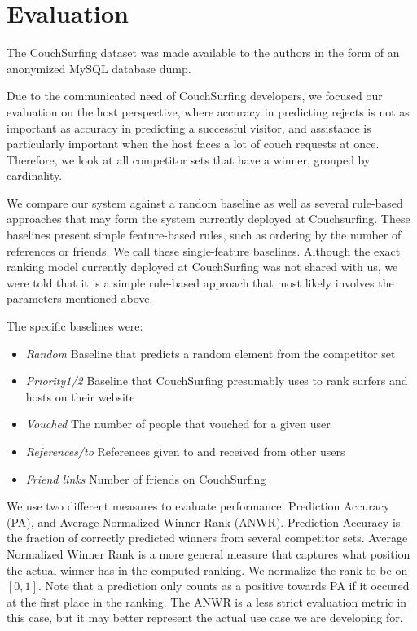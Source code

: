 \section{Evaluation} \label{sec:evaluation}

The CouchSurfing dataset was made available to the authors in the form of an anonymized MySQL database dump.

Due to the communicated need of CouchSurfing developers, we focused our evaluation on the host perspective, where accuracy in predicting rejects is not as important as accuracy in predicting a successful visitor, and assistance is particularly important when the host faces a lot of couch requests at once.
Therefore, we look at all competitor sets that have a winner, grouped by cardinality.

We compare our system against a random baseline as well as several rule-based approaches that may form the system currently deployed at Couchsurfing.
These baselines present simple feature-based rules, such as ordering by the number of references or friends.
We call these single-feature baselines.
Although the exact ranking model currently deployed at CouchSurfing was not shared with us, we were told that it is a simple rule-based approach that most likely involves the parameters mentioned above.

The specific baselines were:
\begin{itemize}
\item \textit{Random} Baseline that predicts a random element from the
competitor set
\item \textit{Priority1/2} Baseline that CouchSurfing presumably uses
to rank surfers and hosts on their website
\item \textit{Vouched} The number of people that vouched for a given user
\item \textit{References/to} References given to and received from other users
\item \textit{Friend links} Number of friends on CouchSurfing
\end{itemize}

We use two different measures to evaluate performance: Prediction Accuracy (PA), and Average Normalized Winner Rank (ANWR).
Prediction Accuracy is the fraction of correctly predicted winners from several competitor sets.
Average Normalized Winner Rank is a more general measure that captures what position the actual winner has in the computed ranking.
We normalize the rank to be on $[0,1]$.
Note that a prediction only counts as a positive towards PA if it occured at the first place in the ranking.
The ANWR is a less strict evaluation metric in this case, but it may better represent the actual use case we are developing for.

